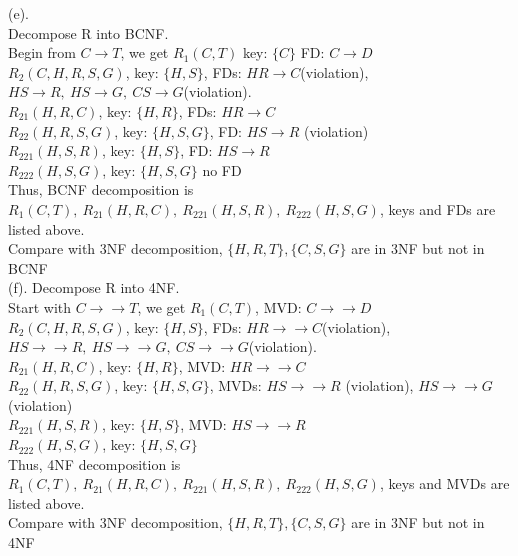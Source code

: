 \documentclass[12pt]{article}
\begin{document}
(e).\\
Decompose R into BCNF.\\
Begin from $C\rightarrow T$, we get $R_{1}(C, T)$ key: $\{C\}$ FD: $C\rightarrow D$\\
$R_{2}(C, H, R, S, G)$, key: $\{H, S\}$, FDs: $HR\rightarrow C$(violation), $HS\rightarrow R,\ HS\rightarrow G,\ CS\rightarrow G$(violation).\\
$R_{21}(H, R, C)$, key: $\{H, R\}$, FDs: $HR\rightarrow C$\\
$R_{22}(H, R, S, G)$, key: $\{H, S, G\}$, FD: $HS\rightarrow R$ (violation)\\
$R_{221}(H, S, R)$, key: $\{H,S\}$, FD: $HS\rightarrow R$\\
$R_{222}(H, S, G)$, key: $\{H, S, G\}$ no FD\\
Thus, BCNF decomposition is $R_{1}(C, T),\ R_{21}(H, R, C),\ R_{221}(H, S, R),\ R_{222}(H, S, G)$, keys and FDs are listed above.\\
Compare with 3NF decomposition, $\{H, R, T\}, \{C, S, G\}$ are in 3NF but not in BCNF\\


(f). Decompose R into 4NF.\\
Start with $C\rightarrow\rightarrow T$, we get $R_{1}(C, T)$, MVD: $C\rightarrow\rightarrow D$\\
$R_{2}(C, H, R, S, G)$, key: $\{H, S\}$, FDs: $HR\rightarrow\rightarrow C$(violation), $HS\rightarrow\rightarrow R,\ HS\rightarrow\rightarrow G,\ CS\rightarrow\rightarrow G$(violation).\\
$R_{21}(H, R, C)$, key: $\{H, R\}$, MVD: $HR\rightarrow\rightarrow C$\\
$R_{22}(H, R, S, G)$, key: $\{H, S, G\}$, MVDs: $HS\rightarrow\rightarrow R$ (violation), $HS\rightarrow\rightarrow G$(violation)\\
$R_{221}(H, S, R)$, key: $\{H,S\}$, MVD: $HS\rightarrow\rightarrow R$\\
$R_{222}(H, S, G)$, key: $\{H, S, G\}$\\
Thus, 4NF decomposition is $R_{1}(C, T),\ R_{21}(H, R, C),\ R_{221}(H, S, R),\ R_{222}(H, S, G)$, keys and MVDs are listed above.\\
Compare with 3NF decomposition, $\{H, R, T\}, \{C, S, G\}$ are in 3NF but not in 4NF\\
\end{document}
